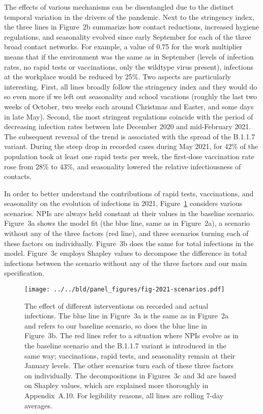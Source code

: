 \documentclass[fleqn,10pt]{wlscirep}
\begin{document}
The effects of various mechanisms can be disentangled due to the distinct temporal
variation in the drivers of the pandemic. Next to the stringency index, the three lines
in Figure~2b summarize how contact reductions,
increased hygiene regulations, and seasonality evolved since early September for each of
the three broad contact networks. For example, a value of 0.75 for the work multiplier
means that if the environment was the same as in September (levels of infection rates,
no rapid tests or vaccinations, only the wildtype virus present), infections at the
workplace would be reduced by 25\%. Two aspects are particularly interesting. First, all
lines broadly follow the stringency index and they would do so even more if we left out
seasonality and school vacations (roughly the last two weeks of October, two weeks each
around Christmas and Easter, and some days in late May). Second, the most stringent
regulations coincide with the period of decreasing infection rates between late December
2020 and mid-February 2021. The subsequent reversal of the trend is associated with the
spread of the B.1.1.7 variant. During the steep drop in recorded cases during May 2021,
for 42\% of the population took at least one rapid tests per week, the first-dose
vaccination rate rose from 28\% to 43\%, and seasonality lowered the relative
infectiousness of contacts.

In order to better understand the contributions of rapid tests, vaccinations, and
seasonality on the evolution of infections in 2021,
Figure~\ref{fig:2021_scenarios_broad} considers various scenarios. NPIs are always held
constant at their values in the baseline scenario. Figure~3a shows the model fit (the
blue line, same as in Figure~2a), a scenario without any of the three factors (red
line), and three scenarios turning each of these factors on individually. Figure~3b does
the same for total infections in the model. Figure~3c employs Shapley values
\cite{Shapley2016} to decompose the difference in total infections between the scenario
without any of the three factors and our main specification.

\begin{figure}[tb]
    \centering
    \texttt{[image: ../../bld/panel\_figures/fig-2021-scenarios.pdf]}
    \caption{
        The effect of different interventions on recorded and actual infections. The
        blue line in Figure~3a is the same as in Figure~2a and refers to our baseline
        scenario, so does the blue line in Figure~3b. The red lines refer to a situation
        where NPIs evolve as in the baseline scenario and the B.1.1.7 variant is
        introduced in the same way; vaccinations, rapid tests, and seasonality remain at
        their January levels. The other scenarios turn each of these three factors on
        individually. The decompositions in Figures~3c and 3d are based on Shapley
        values, which are explained more thoroughly in Appendix~A.10. For legibility
        reasons, all lines are rolling 7-day averages.
    }
    \label{fig:2021_scenarios_broad}
\end{figure}
\end{document}
